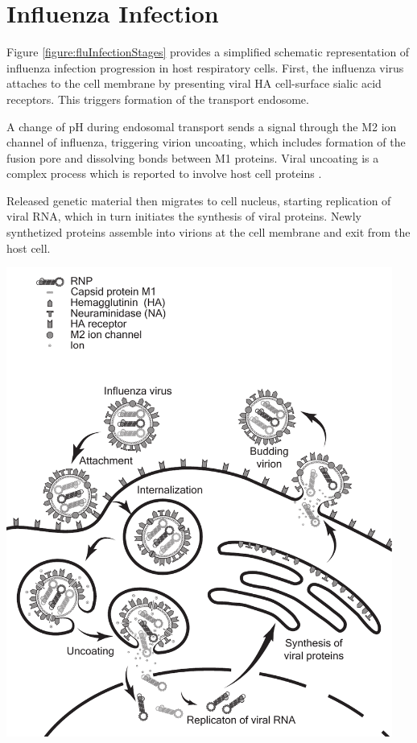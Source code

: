 \section{Influenza Infection}

Figure \ref{figure:fluInfectionStages} provides a simplified schematic representation of influenza infection progression in host respiratory cells. First, the influenza virus attaches to the cell membrane by presenting viral HA cell-surface sialic acid receptors. This triggers formation of the transport endosome.

A change of pH during endosomal transport sends a signal through the M2 ion channel of influenza, triggering virion uncoating, which includes formation of the fusion pore and dissolving bonds between M1 proteins. Viral uncoating is a complex process which is reported to involve host cell proteins \cite{banerjee2014influenza}.

Released genetic material then migrates to cell nucleus, starting replication of viral RNA, which in turn initiates the synthesis of viral proteins. Newly synthetized proteins assemble into virions at the cell membrane and exit from the host cell.

\begin{center}
\includegraphics[width=0.95\textwidth, trim={0cm 0cm 0cm 0cm}, clip]{D_chapters/0_introduction/flu_stages.pdf}
\label{figure:fluInfectionStages}
\end{center}